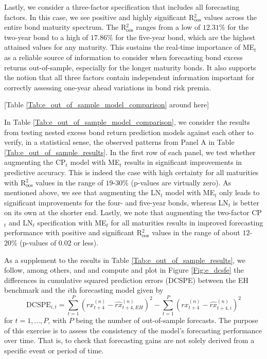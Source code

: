 \documentclass[12pt,letterpaper,leqno,doublespacing]{article}
\begin{document}
Lastly, we consider a three-factor specification that includes all forecasting factors. In this case, we see positive and highly significant R$^{2}_{\text{oos}}$ values across the entire bond maturity spectrum. The R$^{2}_{\text{oos}}$ ranges from a low of $12.31\%$ for the two-year bond to a high of $17.86\%$ for the five-year bond, which are the highest attained values for any maturity. This sustains the real-time importance of ME$_{t}$ as a reliable source of information to consider when forecasting bond excess returns out-of-sample, especially for the longer maturity bonds. It also supports the notion that all three factors contain independent information important for correctly assessing one-year ahead variations in bond risk premia. 

\begin{center}
    [Table \ref{Tab:e_out_of_sample_model_comparison} around here]
\end{center}

In Table \ref{Tab:e_out_of_sample_model_comparison}, we consider the results from testing nested excess bond return prediction models against each other to verify, in a statistical sense, the observed patterns from Panel A in Table \ref{Tab:e_out_of_sample_results}. In the first row of each panel, we test whether augmenting the CP$_{t}$ model with ME$_{t}$ results in significant improvements in predictive accuracy. This is indeed the case with high certainty for all maturities with R$^{2}_{\text{oos}}$ values in the range of $19$-$30\%$ (p-values are virtually zero). As mentioned above, we see that augmenting the LN$_{t}$ model with ME$_{t}$ only leads to significant improvements for the four- and five-year bonds, whereas LN$_{t}$ is better on its own at the shorter end. Lastly, we note that augmenting the two-factor CP$_{t}$ and LN$_{t}$ specification with ME$_{t}$ for all maturities results in improved forecasting performance with positive and significant R$^{2}_{\text{oos}}$ values in the range of about $12$-$20\%$ (p-values of 0.02 or less). 

As a supplement to the results in Table \ref{Tab:e_out_of_sample_results}, we follow, among others, \cite{GoyalWelch2008} and \cite{RapachZhou2013} and compute and plot in Figure \ref{Fig:e_dcsfe} the differences in cumulative squared prediction errors (DCSPE) between the EH benchmark and the $i$th forecasting model given by
\begin{equation}
    \text{DCSPE}_{i,t} = \sum_{t=1}^{P}\left(rx_{t+4}^{\left(n\right)} - \widehat{rx}_{t+4,EH}^{\left(n\right)}\right)^{2} - \sum_{t=1}^{P}\left(rx_{t+4}^{\left(n\right)} - \widehat{rx}_{t+4,i}^{\left(n\right)}\right)^{2}
    \label{eq:e_dcsfe}
\end{equation}
for $t=1,\ldots,P$, with $P$ being the number of out-of-sample forecasts. The purpose of this exercise is to assess the consistency of the model's forecasting performance over time. That is, to check that forecasting gains are not solely derived from a specific event or period of time. 
\end{document}
